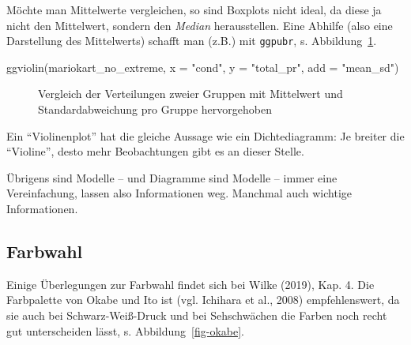 \documentclass[
  letterpaper,
]{scrbook}
\newenvironment{Shaded}{\begin{snugshade}}{\end{snugshade}}
\newcommand{\AttributeTok}[1]{\textcolor[rgb]{0.40,0.45,0.13}{#1}}
\newcommand{\FunctionTok}[1]{\textcolor[rgb]{0.28,0.35,0.67}{#1}}
\newcommand{\NormalTok}[1]{\textcolor[rgb]{0.00,0.23,0.31}{#1}}
\newcommand{\StringTok}[1]{\textcolor[rgb]{0.13,0.47,0.30}{#1}}
\theoremstyle{definition}
\theoremstyle{definition}
\theoremstyle{definition}
\theoremstyle{remark}
\begin{document}
Möchte man Mittelwerte vergleichen, so sind Boxplots nicht ideal, da
diese ja nicht den Mittelwert, sondern den \emph{Median} herausstellen.
Eine Abhilfe (also eine Darstellung des Mittelwerts) schafft man (z.B.)
mit \texttt{ggpubr}, s. Abbildung~\ref{fig-comp-means-ggpubr}.

\begin{Shaded}
\begin{Highlighting}[]
\FunctionTok{ggviolin}\NormalTok{(mariokart\_no\_extreme, }
         \AttributeTok{x =} \StringTok{"cond"}\NormalTok{, }
         \AttributeTok{y =} \StringTok{"total\_pr"}\NormalTok{,}
         \AttributeTok{add =} \StringTok{"mean\_sd"}\NormalTok{) }
\end{Highlighting}
\end{Shaded}

\begin{figure}[H]


\caption{\label{fig-comp-means-ggpubr}Vergleich der Verteilungen zweier
Gruppen mit Mittelwert und Standardabweichung pro Gruppe hervorgehoben}

\end{figure}%

Ein \enquote{Violinenplot} hat die gleiche Aussage wie ein
Dichtediagramm: Je breiter die \enquote{Violine}, desto mehr
Beobachtungen gibt es an dieser Stelle.

Übrigens sind Modelle -- und Diagramme sind Modelle -- immer eine
Vereinfachung, lassen also Informationen weg. Manchmal auch wichtige
Informationen.

\subsection{Farbwahl}\label{sec-farbwahl}

Einige Überlegungen zur Farbwahl findet sich bei Wilke (2019), Kap. 4.
Die Farbpalette von Okabe und Ito ist (vgl. Ichihara et al., 2008)
empfehlenswert, da sie auch bei Schwarz-Weiß-Druck und bei Sehschwächen
die Farben noch recht gut unterscheiden lässt, s.
Abbildung~\ref{fig-okabe}.
\end{document}
